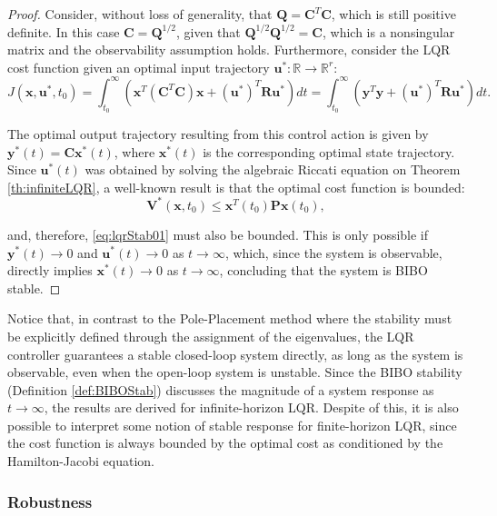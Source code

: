 \documentclass[a4paper,11pt]{book}
\numberwithin{figure}{chapter}
\numberwithin{equation}{chapter}
\numberwithin{table}{chapter}
\theoremstyle{definition}
\begin{document}
\begin{proof}
    Consider, without loss of generality, that $\bm{Q} = \bm{C}^T \bm{C}$, which is still positive definite. In this case $\bm{C} = \bm{Q}^{1/2}$, given that $\bm{Q}^{1/2} \bm{Q}^{1/2} = \bm{C}$, which is a nonsingular matrix and the observability assumption holds. Furthermore, consider the LQR cost function given an optimal input trajectory $\bm{u}^* : \mathbb{R} \rightarrow \mathbb{R}^r$:
    \begin{equation} \label{eq:lqrStab01}
    J(\bm{x},\bm{u}^*,t_0) = \int_{t_0}^{\infty} \left( \bm{x}^T (\bm{C}^T \bm{C}) \bm{x} + (\bm{u}^*)^T \bm{R} \bm{u}^* \right) dt = \int_{t_0}^{\infty} \left( \bm{y}^T \bm{y} + (\bm{u}^*)^T \bm{R} \bm{u}^* \right) dt
.\end{equation}

The optimal output trajectory resulting from this control action is given by $\bm{y}^*(t) = \bm{C} \bm{x}^*(t)$, where $\bm{x}^*(t)$ is the corresponding optimal state trajectory. Since $\bm{u}^*(t)$ was obtained by solving the algebraic Riccati equation on Theorem \ref{th:infiniteLQR}, a well-known result is that the optimal cost function is bounded:
\begin{equation}
    \bm{V}^*(\bm{x}, t_0) \leq \bm{x}^T(t_0) \bm{P} \bm{x}(t_0)
,\end{equation}

\noindent and, therefore, \eqref{eq:lqrStab01} must also be bounded. This is only possible if $\bm{y}^*(t) \to 0$ and $\bm{u}^*(t) \to 0$ as $t \to \infty$, which, since the system is observable, directly implies $\bm{x}^*(t) \to 0$ as $t \to \infty$, concluding that the system is BIBO stable.
\end{proof}

Notice that, in contrast to the Pole-Placement method where the stability must be explicitly defined through the assignment of the eigenvalues, the LQR controller guarantees a stable closed-loop system directly, as long as the system is observable, even when the open-loop system is unstable. Since the BIBO stability (Definition \ref{def:BIBOStab}) discusses the magnitude of a system response as $t \to \infty$, the results are derived for infinite-horizon LQR. Despite of this, it is also possible to interpret some notion of stable response for finite-horizon LQR, since the cost function is always bounded by the optimal cost as conditioned by the Hamilton-Jacobi equation.

\subsubsection{Robustness}
\end{document}

